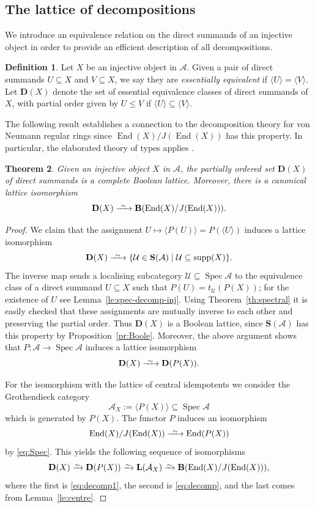 \documentclass[a4paper]{amsart}
\theoremstyle{plain}
\newtheorem{thm}{Theorem}[section]
\theoremstyle{definition}
\newtheorem{defn}[thm]{Definition}
\theoremstyle{remark}
\numberwithin{equation}{section}
\newcommand{\End}{\operatorname{End}}
\newcommand{\Spec}{\operatorname{Spec}}
\newcommand{\supp}{\operatorname{supp}}
\newcommand{\iso}{\xrightarrow{\raisebox{-.4ex}[0ex][0ex]{$\scriptstyle{\sim}$}}}
\newcommand{\longiso}{\xrightarrow{\ \raisebox{-.4ex}[0ex][0ex]{$\scriptstyle{\sim}$}\ }}
\def\A{\mathcal A}
\def\U{\mathcal U}
\def\bfB{\mathbf B}
\def\bfD{\mathbf D}
\def\bfL{\mathbf L}
\def\bfS{\mathbf S}
\begin{document}
\subsection*{The lattice of decompositions}

We introduce an equivalence relation on the direct summands
of an injective object in order to provide an efficient description of
all decompositions. 


\begin{defn}
  Let $X$ be an injective object in $\A$. Given a pair of direct summands $U\subseteq X$ and
  $V\subseteq X$, we say they are \emph{essentially equivalent} if
  $\langle U\rangle=\langle V\rangle$.  Let $\bfD(X)$ denote the set
  of essential equivalence classes of direct summands of $X$, with partial order
  given by $U\le V$ if $\langle U\rangle\subseteq\langle V\rangle$.
\end{defn}

The following result establishes a connection to the decomposition
theory for von Neumann regular rings since $\End(X)/J(\End(X))$ has
this property. In particular, the elaborated theory of types applies
\cite{Ka1951,MvN1936}.

\begin{thm}\label{th:decomp}
  Given an injective object $X$ in $\A$, the partially ordered set $\bfD(X)$ of direct
  summands is a complete Boolean lattice. Moreover, there is a
  canonical lattice isomorphism
\[\bfD(X)\longiso\bfB(\End(X)/J(\End(X))).\]
\end{thm}
\begin{proof}
We claim that the assignment $U\mapsto \langle P(U)\rangle= P(\langle
U\rangle)$ induces a lattice isomorphism
\begin{equation}\label{eq:decomp}
  \bfD(X)\longiso\{\U\in\bfS(\A)\mid \U\subseteq\supp(X)\}.
\end{equation}  
The inverse map sends a localising subcategory $\U\subseteq\Spec\A$ to
the equivalence class of a direct summand $U\subseteq X$ such that
$P(U)=t_\U(P(X))$; for the existence of $U$ see
Lemma~\ref{le:spec-decomp-inj}. Using Theorem~\ref{th:spectral} it is
easily checked that these assignments are mutually inverse to each
other and preserving the partial order. Thus $\bfD(X)$ is a Boolean
lattice, since $\bfS(\A)$ has this property by
Proposition~\ref{pr:Boole}. Moreover, the above argument shows that
$P\colon\A\to\Spec\A$ induces a lattice  isomorphism
\begin{equation}\label{eq:decomp1}
  \bfD(X)\longiso\bfD(P(X)).
\end{equation}

For the isomorphism with the lattice of central idempotents we
consider the Grothendieck category
\[\A_X:=\langle P(X)\rangle\subseteq\Spec\A\] which is generated by
$P(X)$. The functor $P$ induces an isomorphism
\[\End(X)/J(\End(X))\longiso \End(P(X))\] by \eqref{eq:Spec}. This
 yields the following sequence of isomorphisms
 \[\bfD(X)\iso\bfD(P(X))\iso\bfL(\A_X)\iso\bfB(\End(X)/J(\End(X))),\]
 where the first is \eqref{eq:decomp1}, the second is \eqref{eq:decomp}, and the last comes from
 Lemma~\ref{le:centre}.
\end{proof}
\end{document}
